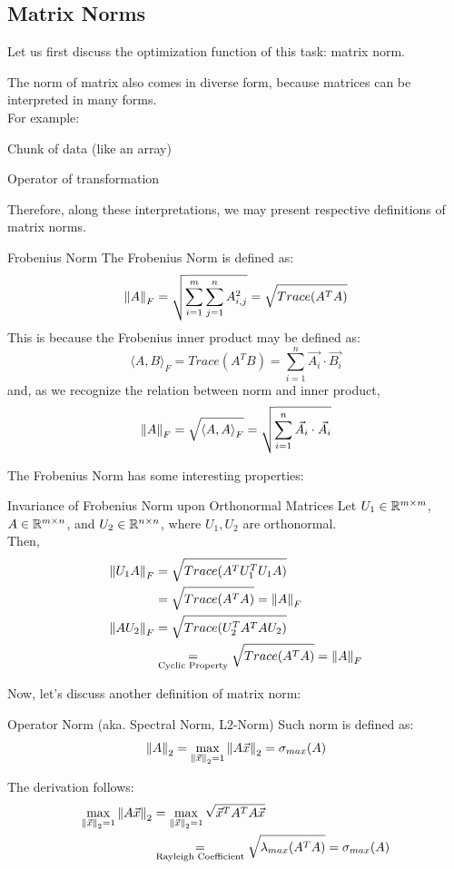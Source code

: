 \subsection{Matrix Norms}
Let us first discuss the optimization function of this task: matrix norm.

The norm of matrix also comes in diverse form, because matrices can be interpreted in many forms. \\
For example:
\begin{bindenum}
    \item Chunk of data (like an array)
    \item Operator of transformation
\end{bindenum}
Therefore, along these interpretations, we may present respective definitions of matrix norms.
\begin{ln-define}{Frobenius Norm}{}
    The Frobenius Norm is defined as:
    \[
        {\| A \|}_{F}^{} = \sqrt{\sum_{i = 1}^m \sum_{j = 1}^n A_{i,j}^2} = \sqrt{Trace(A^T A)}
    \]
    This is because the Frobenius inner product may be defined as:
    \[
        {\langle A, B \rangle}_F = Trace(A^T B) = \sum_{i = 1}^n \vec{A_i} \cdot \vec{B_i}
    \]
    and, as we recognize the relation between norm and inner product,
    \[
        {\| A \|}_{F}^{} = \sqrt{{\langle A, A \rangle}_F} = \sqrt{\sum_{i = 1}^n \vec{A_i} \cdot \vec{A_i}}
    \]
\end{ln-define}
The Frobenius Norm has some interesting properties:
\begin{ln-theorem}{Invariance of Frobenius Norm upon Orthonormal Matrices}{}
    Let $U_1 \in \mathbb{R}^{m \times m}$, $A \in \mathbb{R}^{m \times n}$, and $U_2 \in \mathbb{R}^{n \times n}$, where $U_1, U_2$ are orthonormal. \\
    Then,
    \begin{align*}
        {\| U_1 A \|}_{F}^{}
        &= \sqrt{Trace(A^T U_1^T U_1 A)} \\
        &= \sqrt{Trace(A^T A)} = {\| A \|}_{F}^{} \\
        {\| A U_2 \|}_{F}^{}
        &= \sqrt{Trace(U_2^T A^T A U_2)} \\
        &\underset{\text{Cyclic Property}}{=} \sqrt{Trace(A^T A)} = {\| A \|}_{F}^{} \\
    \end{align*}
\end{ln-theorem}
Now, let's discuss another definition of matrix norm:
\begin{ln-define}{Operator Norm (aka. Spectral Norm, L2-Norm)}{}
    Such norm is defined as:
    \[
        {\| A \|}_{2}^{} = \max_{{\| \vec{x} \|}_{2}^{} = 1} {\| A \vec{x} \|}_{2}^{} = \sigma_{max}(A)
    \]
\end{ln-define}
The derivation follows:
\begin{align*}
    \max_{{\| \vec{x} \|}_{2}^{} = 1} {\| A \vec{x} \|}_{2}^{}
    &= \max_{{\| \vec{x} \|}_{2}^{} = 1} \sqrt{\vec{x}^T A^T A \vec{x}} \\
    &\underset{\text{Rayleigh Coefficient}}{=} \sqrt{\lambda_{max}(A^T A)} = \sigma_{max}(A)
\end{align*}

